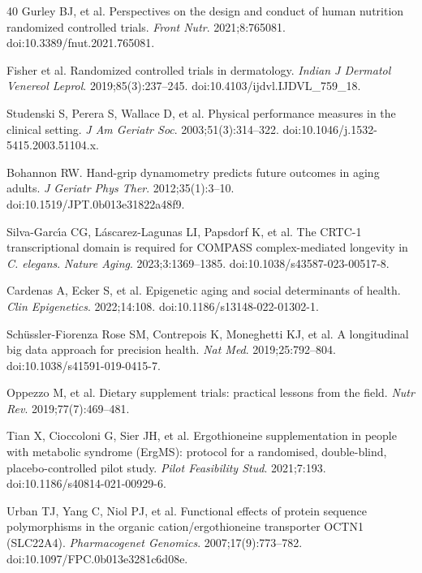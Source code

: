 \documentclass[11pt,a4paper]{article}
\begin{document}
\begin{thebibliography}{40}
Gurley BJ, et al.
Perspectives on the design and conduct of human nutrition randomized controlled trials.
\textit{Front Nutr}. 2021;8:765081.
doi:10.3389/fnut.2021.765081.

Fisher et al.
Randomized controlled trials in dermatology.
\textit{Indian J Dermatol Venereol Leprol}. 2019;85(3):237--245.
doi:10.4103/ijdvl.IJDVL\_759\_18.

Studenski S, Perera S, Wallace D, et al.
Physical performance measures in the clinical setting.
\textit{J Am Geriatr Soc}. 2003;51(3):314--322.
doi:10.1046/j.1532-5415.2003.51104.x.

Bohannon RW.
Hand-grip dynamometry predicts future outcomes in aging adults.
\textit{J Geriatr Phys Ther}. 2012;35(1):3--10.
doi:10.1519/JPT.0b013e31822a48f9.

Silva-Garc{\'\i}a CG, L{\'a}scarez-Lagunas LI, Papsdorf K, et al.
The CRTC-1 transcriptional domain is required for COMPASS complex-mediated longevity in \textit{C. elegans}.
\textit{Nature Aging}. 2023;3:1369--1385.
doi:10.1038/s43587-023-00517-8.

Cardenas A, Ecker S, et al.
Epigenetic aging and social determinants of health.
\textit{Clin Epigenetics}. 2022;14:108.
doi:10.1186/s13148-022-01302-1.

Sch{\"u}ssler-Fiorenza Rose SM, Contrepois K, Moneghetti KJ, et al.
A longitudinal big data approach for precision health.
\textit{Nat Med}. 2019;25:792--804.
doi:10.1038/s41591-019-0415-7.

Oppezzo M, et al.
Dietary supplement trials: practical lessons from the field.
\textit{Nutr Rev}. 2019;77(7):469--481.

Tian X, Cioccoloni G, Sier JH, et al.
Ergothioneine supplementation in people with metabolic syndrome (ErgMS): protocol for a randomised, double-blind, placebo-controlled pilot study.
\textit{Pilot Feasibility Stud}. 2021;7:193.
doi:10.1186/s40814-021-00929-6.

Urban TJ, Yang C, Niol PJ, et al.
Functional effects of protein sequence polymorphisms in the organic cation/ergothioneine transporter OCTN1 (SLC22A4).
\textit{Pharmacogenet Genomics}. 2007;17(9):773--782.
doi:10.1097/FPC.0b013e3281c6d08e.

\end{thebibliography}
\end{document}
